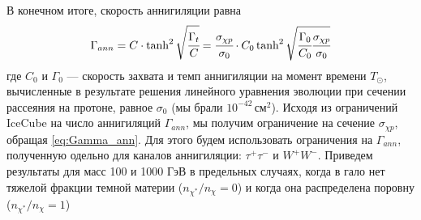 В конечном итоге, скорость аннигиляции равна
\begin{equation}
	\Gamma_{ann} = C \cdot \tanh^2{\sqrt{\cfrac{\Gamma_t}{C}}} = 
	\cfrac{\sigma_{\chi p}}{\sigma_0} \cdot {C_0} 
	\tanh^2{ \sqrt{\cfrac{\Gamma_0}{C_0} \cfrac{\sigma_{\chi p}}{\sigma_0}}}
	\label{eq:Gamma_ann}
\end{equation}
где $C_0$ и $\Gamma_0$ --- скорость захвата и темп аннигиляции на момент времени $T_{\odot}$, вычисленные в результате решения линейного уравнения эволюции при сечении рассеяния на протоне, равное $\sigma_{0}$ (мы брали $10^{-42}\,\text{см}^2$). Исходя из ограничений IceCube \cite{Aartsen_2017} на число аннигиляций $\Gamma_{ann}$, мы получим ограничение на сечение $\sigma_{\chi p}$, обращая \ref{eq:Gamma_ann}. Для этого будем использовать ограничения на $\Gamma_{ann}$, полученную одельно для каналов аннигиляции: $\tau^+\tau^-$ и $W^+W^-$. Приведем результаты для масс 100 и 1000 ГэВ в предельных случаях, когда в гало нет тяжелой фракции темной материи ($n_{\chi^*}/n_{\chi}= 0$) и когда она распределена поровну ($n_{\chi^*}/n_{\chi}= 1$)

